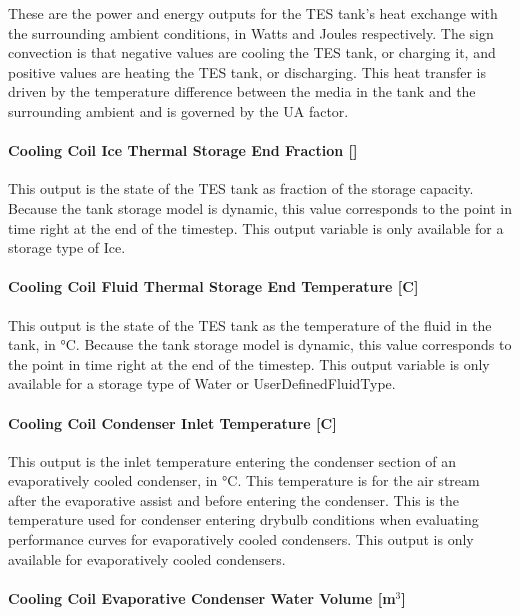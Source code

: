 These are the power and energy outputs for the TES tank's heat exchange with the surrounding ambient conditions, in Watts and Joules respectively. The sign convection is that negative values are cooling the TES tank, or charging it, and positive values are heating the TES tank, or discharging. This heat transfer is driven by the temperature difference between the media in the tank and the surrounding ambient and is governed by the UA factor.

\paragraph{Cooling Coil Ice Thermal Storage End Fraction {[]}}\label{cooling-coil-ice-thermal-storage-end-fraction}

This output is the state of the TES tank as fraction of the storage capacity. Because the tank storage model is dynamic, this value corresponds to the point in time right at the end of the timestep. This output variable is only available for a storage type of Ice.

\paragraph{Cooling Coil Fluid Thermal Storage End Temperature {[}C{]}}\label{cooling-coil-fluid-thermal-storage-end-temperature-c}

This output is the state of the TES tank as the temperature of the fluid in the tank, in °C. Because the tank storage model is dynamic, this value corresponds to the point in time right at the end of the timestep. This output variable is only available for a storage type of Water or UserDefinedFluidType.

\paragraph{Cooling Coil Condenser Inlet Temperature {[}C{]}}\label{cooling-coil-condenser-inlet-temperature-c-2}

This output is the inlet temperature entering the condenser section of an evaporatively cooled condenser, in °C. This temperature is for the air stream after the evaporative assist and before entering the condenser. This is the temperature used for condenser entering drybulb conditions when evaluating performance curves for evaporatively cooled condensers. This output is only available for evaporatively cooled condensers.

\paragraph{Cooling Coil Evaporative Condenser Water Volume {[}m\(^{3}\){]}}\label{cooling-coil-evaporative-condenser-water-volume-m3-2}

